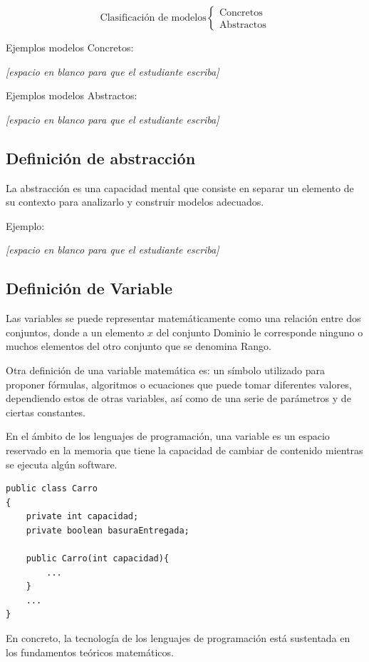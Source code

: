 \documentclass[11pt,letterpaper]{report}
\newcommand{\espacio}{\par\noindent\textit{[espacio en blanco para que el estudiante escriba]}\par}
\begin{document}
\[
\text{Clasificación de modelos}
\begin{cases}
\text{Concretos}\\
\text{Abstractos}
\end{cases}
\]

Ejemplos modelos Concretos:
\espacio

Ejemplos modelos Abstractos:
\espacio

\subsection*{Definición de abstracción}

La abstracción es una capacidad mental que consiste en separar un elemento de su contexto para analizarlo y construir modelos adecuados.

Ejemplo:
\espacio

\subsection*{Definición de Variable}

Las variables se puede representar matemáticamente como una relación entre dos conjuntos, donde a un elemento $x$ del conjunto Dominio le corresponde ninguno o muchos elementos del otro conjunto que se denomina Rango.

\begin{center}
\end{center}

Otra definición de una variable matemática es: un símbolo utilizado para proponer fórmulas, algoritmos o ecuaciones que puede tomar diferentes valores, dependiendo estos de otras variables, así como de una serie de parámetros y de ciertas constantes.

En el ámbito de los lenguajes de programación, una variable es un espacio reservado en la memoria que tiene la capacidad de cambiar de contenido mientras se ejecuta algún software.

\begin{verbatim}
public class Carro
{
    private int capacidad;
    private boolean basuraEntregada;

    public Carro(int capacidad){
        ...
    }
    ...
}
\end{verbatim}

En concreto, la tecnología de los lenguajes de programación está sustentada en los fundamentos teóricos matemáticos.
\end{document}
